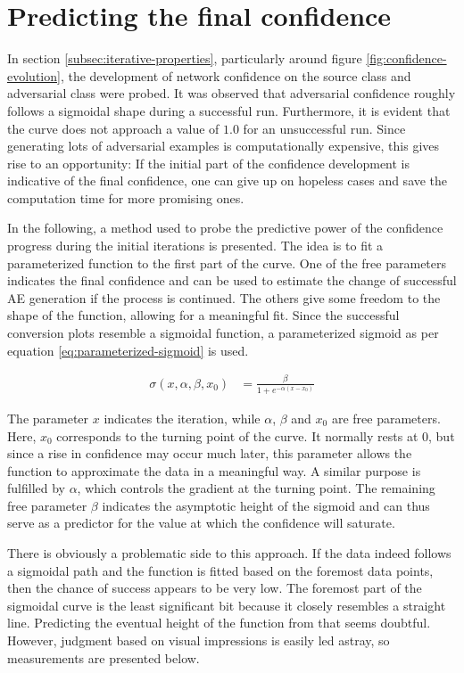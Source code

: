 \documentclass[11pt, a4paper]{article}
\newcommand\braces[1]{\left(#1\right)}
\begin{document}
\section{Predicting the final confidence}
\label{sec:predicting-final-confidence}
In section \ref{subsec:iterative-properties}, particularly around figure \ref{fig:confidence-evolution}, the development of network confidence on the source class and adversarial class were probed. It was observed that adversarial confidence roughly follows a sigmoidal shape during a successful run. Furthermore, it is evident that the curve does not approach a value of $1.0$ for an unsuccessful run. Since generating lots of adversarial examples is computationally expensive, this gives rise to an opportunity: If the initial part of the confidence development is indicative of the final confidence, one can give up on hopeless cases and save the computation time for more promising ones.

In the following, a method used to probe the predictive power of the confidence progress during the initial iterations is presented. The idea is to fit a parameterized function to the first part of the curve. One of the free parameters indicates the final confidence and can be used to estimate the change of successful AE generation if the process is continued. The others give some freedom to the shape of the function, allowing for a meaningful fit. Since the successful conversion plots resemble a sigmoidal function, a parameterized sigmoid as per equation \eqref{eq:parameterized-sigmoid} is used.

\begin{align}
	\sigma \braces{x, \alpha, \beta, x_0} &= \frac{\beta}{1 + e^{-\alpha \braces{x - x_0}}} \label{eq:parameterized-sigmoid}
\end{align}

The parameter $x$ indicates the iteration, while $\alpha$, $\beta$ and $x_0$ are free parameters. Here, $x_0$ corresponds to the turning point of the curve. It normally rests at $0$, but since a rise in confidence may occur much later, this parameter allows the function to approximate the data in a meaningful way. A similar purpose is fulfilled by $\alpha$, which controls the gradient at the turning point. The remaining free parameter $\beta$ indicates the asymptotic height of the sigmoid and can thus serve as a predictor for the value at which the confidence will saturate.

There is obviously a problematic side to this approach. If the data indeed follows a sigmoidal path and the function is fitted based on the foremost data points, then the chance of success appears to be very low. The foremost part of the sigmoidal curve is the least significant bit because it closely resembles a straight line. Predicting the eventual height of the function from that seems doubtful. However, judgment based on visual impressions is easily led astray, so measurements are presented below.
\end{document}
